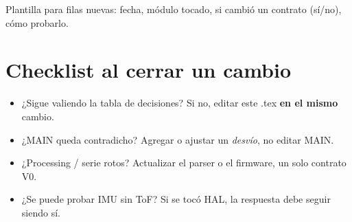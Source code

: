 \documentclass[11pt,a4paper]{article}
\begin{document}
Plantilla para filas nuevas: fecha, m\'odulo tocado, si cambi\'o un contrato
(s\'i/no), c\'omo probarlo.

\section{Checklist al cerrar un cambio}

\begin{itemize}
  \item ¿Sigue valiendo la tabla de decisiones? Si no, editar este .tex
        \textbf{en el mismo} cambio.
  \item ¿MAIN queda contradicho? Agregar o ajustar un \emph{desv\'io}, no
        editar MAIN.
  \item ¿Processing / serie rotos? Actualizar el parser o el firmware,
        un solo contrato V0.
  \item ¿Se puede probar IMU sin ToF? Si se toc\'o HAL, la respuesta debe
        seguir siendo s\'i.
\end{itemize}
\end{document}
